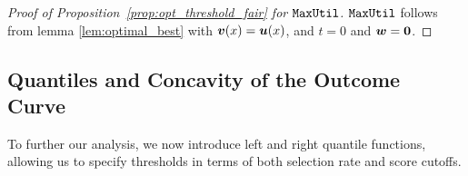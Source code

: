 		\begin{proof}[Proof of Proposition~\ref{prop:opt_threshold_fair} for $\mathtt{MaxUtil}$] $\mathtt{MaxUtil}$ follows from  lemma \ref{lem:optimal_best} with $\boldsymbol{v}(x) = \boldsymbol{u}(x)$, and $t = 0$ and $\boldsymbol{w} = \mathbf{0}$. 
			
		\end{proof}
		
		


\subsection{Quantiles and Concavity of the Outcome Curve\label{section:concavity_outcome}}
	To further our analysis, we now introduce left and right quantile functions, allowing us to specify thresholds in terms of both selection rate and score  cutoffs. 

